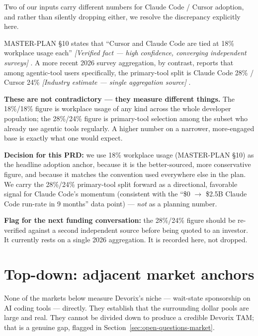 Two of our inputs carry different numbers for Claude Code / Cursor adoption, and rather than silently dropping either, we resolve the discrepancy explicitly here.

MASTER-PLAN \S 10 states that ``Cursor and Claude Code are tied at 18\% workplace usage each'' \textit{[Verified fact --- high confidence, converging independent surveys]} \cite{masterplan_2026}. A more recent 2026 survey aggregation, by contrast, reports that among agentic-tool users specifically, the primary-tool split is Claude Code 28\% / Cursor 24\% \textit{[Industry estimate --- single aggregation source]} \cite{agentictoolsurvey_2026}.

\textbf{These are not contradictory --- they measure different things.} The 18\%/18\% figure is workplace usage of any kind across the whole developer population; the 28\%/24\% figure is primary-tool selection among the subset who already use agentic tools regularly. A higher number on a narrower, more-engaged base is exactly what one would expect.

\textbf{Decision for this PRD:} we use 18\% workplace usage (MASTER-PLAN \S 10) as the headline adoption anchor, because it is the better-sourced, more conservative figure, and because it matches the convention used everywhere else in the plan. We carry the 28\%/24\% primary-tool split forward as a directional, favorable signal for Claude Code's momentum (consistent with the ``\$0 \(\to\) \$2.5B Claude Code run-rate in 9 months'' data point) --- \emph{not} as a planning number.

\textbf{Flag for the next funding conversation:} the 28\%/24\% figure should be re-verified against a second independent source before being quoted to an investor. It currently rests on a single 2026 aggregation. It is recorded here, not dropped.

\section{Top-down: adjacent market anchors}
\label{sec:top-down}

None of the markets below measure Devorix's niche --- wait-state sponsorship on AI coding tools --- directly. They establish that the surrounding dollar pools are large and real. They cannot be divided down to produce a credible Devorix TAM; that is a genuine gap, flagged in Section~\ref{sec:open-questions-market}.

